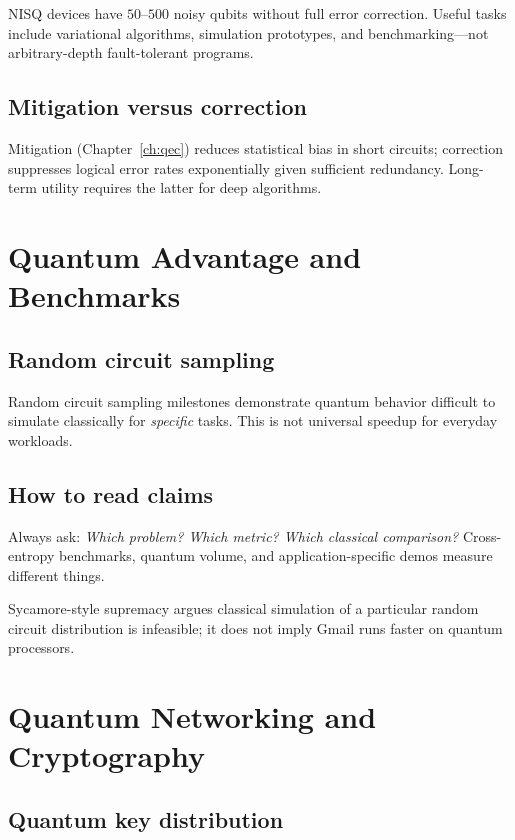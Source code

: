 NISQ devices \cite{preskill2018} have $50$--$500$ noisy qubits without full error correction. Useful tasks include variational algorithms, simulation prototypes, and benchmarking---not arbitrary-depth fault-tolerant programs.

\subsection{Mitigation versus correction}

Mitigation (Chapter~\ref{ch:qec}) reduces statistical bias in short circuits; correction suppresses logical error rates exponentially given sufficient redundancy. Long-term utility requires the latter for deep algorithms.

\section{Quantum Advantage and Benchmarks}
\label{sec:advantage}

\subsection{Random circuit sampling}

Random circuit sampling milestones \cite{arute2019} demonstrate quantum behavior difficult to simulate classically for \emph{specific} tasks. This is not universal speedup for everyday workloads.

\subsection{How to read claims}

Always ask: \emph{Which problem? Which metric? Which classical comparison?} Cross-entropy benchmarks, quantum volume, and application-specific demos measure different things.

\begin{example}
Sycamore-style supremacy argues classical simulation of a particular random circuit distribution is infeasible; it does not imply Gmail runs faster on quantum processors.
\end{example}

\section{Quantum Networking and Cryptography}
\label{sec:networking-crypto}

\subsection{Quantum key distribution}

